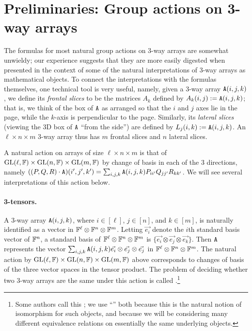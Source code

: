 \section{Preliminaries: Group actions on 3-way arrays} 
\label{sec:problems}
The formulas for most natural group actions on 3-way arrays are somewhat unwieldy; our experience suggests that they are more easily digested when presented in the context of some of the natural interpretations of 3-way arrays as mathematical objects. To connect the interpretations with the formulas themselves, one technical tool is very useful, namely, given a 3-way array $\mathtt{A}(i,j,k)$, we define its \emph{frontal slices} to be the matrices $A_k$ defined by $A_k(i,j) := \mathtt{A}(i,j,k)$; that is, we think of the box of $\mathtt{A}$ as arranged so that the $i$ and $j$ axes lie in the page, while the $k$-axis is perpendicular to the page. Similarly, its \emph{lateral slices} (viewing the 3D box of $\mathtt{A}$ ``from the side'') are defined by $L_j(i,k) := \mathtt{A}(i,j,k)$. An $\ell \times n \times m$ 3-way array thus has $m$ frontal slices and $n$ lateral slices.

A natural action on arrays of size $\ell \times n \times m$ is that of $\mathrm{GL}(\ell, \mathbb{F}) \times \mathrm{GL}(n,\mathbb{F}) \times \mathrm{GL}(m,\mathbb{F})$ by change of 
basis in each of the 3 directions, namely $((P,Q,R) \cdot \mathtt{A})(i',j',k') = 
\sum_{i,j,k} \mathtt{A}(i,j,k) P_{ii'} Q_{jj'} R_{kk'}$. We will see several 
interpretations of this action below.

\paragraph{3-tensors.} A 3-way array $\mathtt{A}(i,j,k)$, 
where $i\in[\ell]$, 
$j\in[n]$, and $k\in[m]$, is naturally identified as a vector in 
$\mathbb{F}^\ell\otimes\mathbb{F}^n\otimes\mathbb{F}^m$. Letting $\vec{e_i}$ denote the $i$th 
standard basis vector of $\mathbb{F}^n$,  a standard basis of 
$\mathbb{F}^\ell\otimes\mathbb{F}^n\otimes\mathbb{F}^m$ is 
$\{\vec{e_i}\otimes\vec{e_j}\otimes\vec{e_k}\}$. Then $\mathtt{A}$ represents the vector 
$\sum_{i,j,k}\mathtt{A}(i,j,k)\vec{e_i}\otimes\vec{e_j}\otimes\vec{e_j}$ in 
$\mathbb{F}^\ell\otimes\mathbb{F}^n\otimes\mathbb{F}^m$. The natural action by 
$\mathrm{GL}(\ell, \mathbb{F})\times\mathrm{GL}(n, \mathbb{F})\times\mathrm{GL}(m, \mathbb{F})$ above corresponds to changes of 
basis of the three vector spaces in the tensor product. The problem of deciding 
whether 
two 3-way arrays are the same under this action is called 
\ThreeTIlong.\footnote{Some authors call this ; we use 
``'' both because this is the natural notion of isomorphism 
for such objects, and because we will be considering many different equivalence 
relations on essentially the same underlying objects.}



